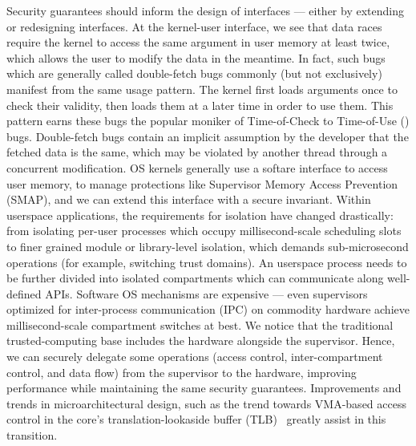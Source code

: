 Security guarantees should inform the design of interfaces --- either by 
extending or redesigning interfaces.
% 
At the kernel-user interface, we see that data races require the kernel
to access the same argument in user memory at least twice, which
allows the user to modify the data in the meantime.
In fact, such bugs which are generally called double-fetch bugs 
commonly (but not exclusively)
manifest from the same usage pattern.
The kernel first loads arguments once to check their validity, then
loads them at a later time in order to use them.
This pattern earns these bugs the popular moniker of 
Time-of-Check to Time-of-Use (\tocttou) bugs.
Double-fetch bugs contain an implicit assumption by the developer
that the fetched data is the same, which may be violated by another thread
through a concurrent modification.
OS kernels generally use a softare interface to access user memory, to manage
protections like Supervisor Memory Access Prevention (SMAP), and we can
extend this interface with a secure invariant.
% 
Within userspace applications, the requirements for isolation have changed 
drastically: from isolating per-user processes which occupy millisecond-scale
scheduling slots to finer grained module or library-level isolation, which
demands sub-microsecond operations (for example, switching trust domains).
An userspace process needs to be further divided into isolated compartments
which can communicate along well-defined APIs.
Software OS mechanisms are expensive --- even supervisors optimized for
inter-process communication (IPC) on commodity hardware achieve 
millisecond-scale compartment switches at best.
We notice that the traditional trusted-computing base includes the hardware
alongside the supervisor.
Hence, we can securely delegate some operations (access control, inter-compartment
control, and data flow) from the supervisor to the hardware, improving 
performance while maintaining the same security guarantees.
Improvements and trends in microarchitectural design, such as the trend towards
VMA-based access control in the core's translation-lookaside buffer 
(TLB)~\cite{0003BOBFP21midgard} greatly assist in this transition.



